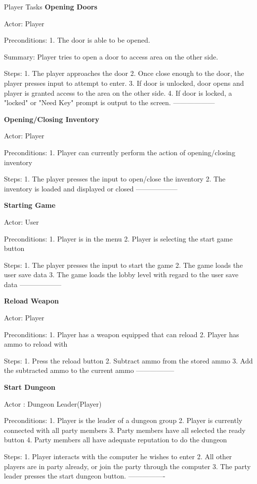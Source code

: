 \documentclass[12pt]{report}
\begin{document}
\begin {section}{Player Tasks}
\textbf{Opening Doors} %

Actor: Player

Preconditions:
1. The door is able to be opened.

Summary: Player tries to open a door to access area on the other side. 

Steps:
1. The player approaches the door
2. Once close enough to the door, the player presses input to attempt to enter.
3. If door is unlocked, door opens and player is granted access to the area on the other side.
4. If door is locked, a "locked" or "Need Key" prompt is output to the screen.
------------------

\textbf{Opening/Closing Inventory} %

Actor: Player

Preconditions: 
1. Player can currently perform the action of opening/closing inventory

Steps:
1. The player presses the input to open/close the inventory
2. The inventory is loaded and displayed or closed 
------------------

\textbf{Starting Game} %

Actor: User

Preconditions: 
1. Player is in the menu
2. Player is selecting the start game button

Steps:
1. The player presses the input to start the game
2. The game loads the user save data
3. The game loads the lobby level with regard to the user save data
------------------

\textbf{Reload Weapon} %

Actor: Player

Preconditions: 
1. Player has a weapon equipped that can reload
2. Player has ammo to reload with

Steps:
1. Press the reload button
2. Subtract ammo from the stored ammo
3. Add the subtracted ammo to the current ammo
-----------------

\textbf{Start Dungeon} %

Actor : Dungeon Leader(Player)

Preconditions:
1. Player is the leader of a dungeon group
2. Player is currently connected with all party members
3. Party members have all selected the ready button
4. Party members all have adequate reputation to do the dungeon

Steps:
1. Player interacts with the computer he wishes to enter
2. All other players are in party already, or join the party through the computer
3. The party leader presses the start dungeon button.
----------------


\end{section}
\end{document}
